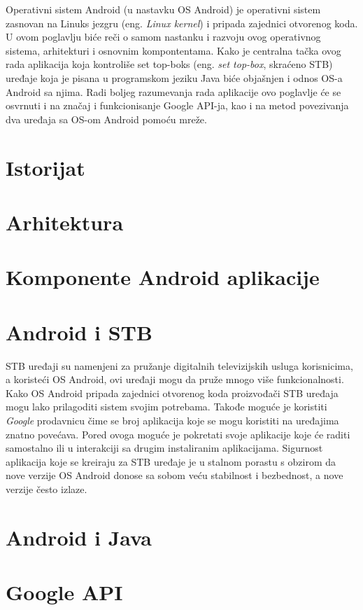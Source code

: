 \documentclass[../TamaraIvanovicMasterRad.tex]{subfiles}
\begin{document}
Operativni sistem Android (u nastavku OS Android) je operativni sistem zasnovan na Linuks jezgru (eng. \textit{Linux kernel}) i pripada zajednici otvorenog koda. U ovom poglavlju biće reči o samom nastanku i razvoju ovog operativnog sistema, arhitekturi i osnovnim kompontentama. Kako je centralna tačka ovog rada aplikacija koja kontroliše set top-boks (eng. \textit{set top-box}, skraćeno STB) uređaje koja je pisana u programskom jeziku Java biće objašnjen i odnos OS-a Android sa njima. Radi boljeg razumevanja rada aplikacije ovo poglavlje će se osvrnuti i na značaj i funkcionisanje Google API-ja, kao i na metod povezivanja dva uređaja sa OS-om Android pomoću mreže. 
\section{Istorijat}



\section{Arhitektura}



\section{Komponente Android aplikacije}


\section{Android i STB}
STB uređaji su namenjeni za pružanje digitalnih televizijskih usluga korisnicima, a koristeći OS Android, ovi uređaji mogu da pruže mnogo više funkcionalnosti. Kako OS Android pripada zajednici otvorenog koda proizvođači STB uređaja mogu lako prilagoditi sistem svojim potrebama. Takođe moguće je koristiti \textit{Google} prodavnicu čime se broj aplikacija koje se mogu koristiti na uređajima znatno povećava. Pored ovoga moguće je pokretati svoje aplikacije koje će raditi samostalno ili u interakciji sa drugim instaliranim aplikacijama. Sigurnost aplikacija koje se kreiraju za STB uređaje je u stalnom porastu s obzirom da nove verzije OS Android donose sa sobom veću stabilnost i bezbednost, a nove verzije često izlaze. 

\section{Android i Java}
\section{Google API}

\end{document}
